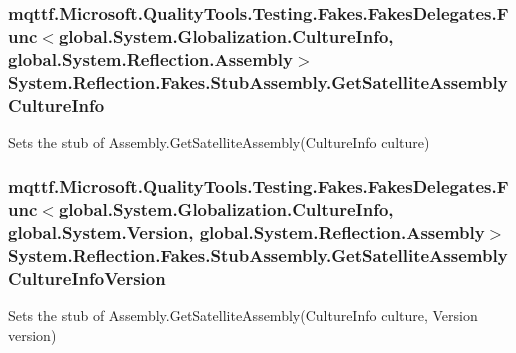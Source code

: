 \hypertarget{class_system_1_1_reflection_1_1_fakes_1_1_stub_assembly_ab74404daaacf9351673b34b7cb87ffa0}{
\subsubsection[{Get\-Satellite\-Assembly\-Culture\-Info}]{\setlength{\rightskip}{0pt plus 5cm}mqttf.\-Microsoft.\-Quality\-Tools.\-Testing.\-Fakes.\-Fakes\-Delegates.\-Func$<$global.\-System.\-Globalization.\-Culture\-Info, global.\-System.\-Reflection.\-Assembly$>$ System.\-Reflection.\-Fakes.\-Stub\-Assembly.\-Get\-Satellite\-Assembly\-Culture\-Info}}\label{class_system_1_1_reflection_1_1_fakes_1_1_stub_assembly_ab74404daaacf9351673b34b7cb87ffa0}


Sets the stub of Assembly.\-Get\-Satellite\-Assembly(\-Culture\-Info culture)

\hypertarget{class_system_1_1_reflection_1_1_fakes_1_1_stub_assembly_acd122bd330cb44eb78f75cf6732974c3}{
\subsubsection[{Get\-Satellite\-Assembly\-Culture\-Info\-Version}]{\setlength{\rightskip}{0pt plus 5cm}mqttf.\-Microsoft.\-Quality\-Tools.\-Testing.\-Fakes.\-Fakes\-Delegates.\-Func$<$global.\-System.\-Globalization.\-Culture\-Info, global.\-System.\-Version, global.\-System.\-Reflection.\-Assembly$>$ System.\-Reflection.\-Fakes.\-Stub\-Assembly.\-Get\-Satellite\-Assembly\-Culture\-Info\-Version}}\label{class_system_1_1_reflection_1_1_fakes_1_1_stub_assembly_acd122bd330cb44eb78f75cf6732974c3}


Sets the stub of Assembly.\-Get\-Satellite\-Assembly(\-Culture\-Info culture, Version version)

